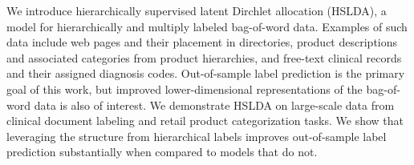 We introduce hierarchically supervised latent Dirchlet allocation (HSLDA), a
model for hierarchically and multiply labeled bag-of-word data.  Examples of
such data include web pages and their placement in directories, product
descriptions and associated categories from product hierarchies, and free-text
clinical records and their assigned diagnosis codes. Out-of-sample label
prediction is the primary goal of this work, but improved lower-dimensional
representations of the bag-of-word data is also of interest.
We demonstrate HSLDA on large-scale data from clinical document labeling and
retail product categorization tasks. We show that leveraging the structure from
hierarchical labels improves out-of-sample label prediction substantially when
compared to models that do not. %


